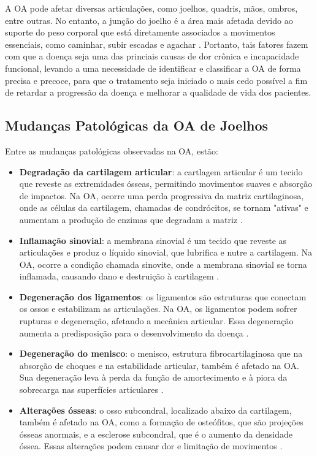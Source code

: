 A OA pode afetar diversas articulações, como joelhos, quadris, mãos, ombros, entre outras. No entanto, a junção do joelho é a área mais afetada devido ao suporte do peso corporal que está diretamente associados a movimentos essenciais, como caminhar, subir escadas e agachar \citep{Kanamoto2020}. Portanto, tais fatores fazem com que a doença seja uma das princiais causas de dor crônica e incapacidade funcional, levando a uma necessidade de identificar e classificar a OA de forma precisa e precoce, para que o tratamento seja iniciado o mais cedo possível a fim de retardar a progressão da doença e melhorar a qualidade de vida dos pacientes.

\subsection{Mudanças Patológicas da OA de Joelhos}

Entre as mudanças patológicas observadas na OA, estão:

\begin{itemize}
    \item \textbf{Degradação da cartilagem articular}: a cartlagem articular é um tecido que reveste as extremidades ósseas, permitindo movimentos suaves e absorção de impactos. Na OA, ocorre uma perda progressiva da matriz cartilaginosa, onde as células da cartilagem, chamadas de condrócitos, se tornam "ativas" e aumentam a produção de enzimas que degradam a matriz \citep{Goldring2009}.
    \item \textbf{Inflamação sinovial}: a membrana sinovial é um tecido que reveste as articulações e produz o líquido sinovial, que lubrifica e nutre a cartilagem. Na OA, ocorre a condição chamada sinovite, onde a membrana sinovial se torna inflamada, causando dano e destruição à cartilagem \citep{Pessler2008}.
    \item \textbf{Degeneração dos ligamentos}: os ligamentos são estruturas que conectam os ossos e estabilizam as articulações. Na OA, os ligamentos podem sofrer rupturas e degeneração, afetando a mecânica articular. Essa degeneração aumenta a predisposição para o desenvolvimento da doença \citep{Loeser2012}.
    \item \textbf{Degeneração do menisco}: o menisco, estrutura fibrocartilaginosa que na absorção de choques e na estabilidade articular, também é afetado na OA. Sua degeneração leva à perda da função de amortecimento e à piora da sobrecarga nas superfícies articulares \citep{Loeser2012}.
    \item \textbf{Alterações ósseas}: o osso subcondral, localizado abaixo da cartilagem, também é afetado na OA, como a formação de osteófitos, que são projeções ósseas anormais, e a esclerose subcondral, que é o aumento da densidade óssea. Essas alterações podem causar dor e limitação de movimentos \citep{vanderKraan2007}.
\end{itemize}


